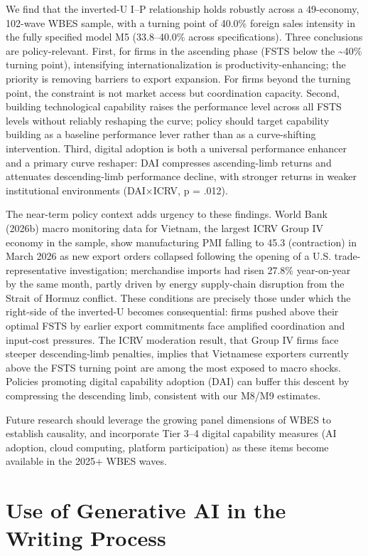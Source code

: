 \documentclass[
  12pt]{article}
\begin{document}
We find that the inverted-U I--P relationship holds robustly across a
49-economy, 102-wave WBES sample, with a turning point of 40.0\% foreign
sales intensity in the fully specified model M5 (33.8--40.0\% across
specifications). Three conclusions are policy-relevant. First, for firms
in the ascending phase (FSTS below the \textasciitilde40\% turning
point), intensifying internationalization is productivity-enhancing; the
priority is removing barriers to export expansion. For firms beyond the
turning point, the constraint is not market access but coordination
capacity. Second, building technological capability raises the
performance level across all FSTS levels without reliably reshaping the
curve; policy should target capability building as a baseline
performance lever rather than as a curve-shifting intervention. Third,
digital adoption is both a universal performance enhancer and a primary
curve reshaper: DAI compresses ascending-limb returns and attenuates
descending-limb performance decline, with stronger returns in weaker
institutional environments (DAI×ICRV, p = .012).

The near-term policy context adds urgency to these findings. World Bank
(2026b) macro monitoring data for Vietnam, the largest ICRV Group IV
economy in the sample, show manufacturing PMI falling to 45.3
(contraction) in March 2026 as new export orders collapsed following the
opening of a U.S. trade-representative investigation; merchandise
imports had risen 27.8\% year-on-year by the same month, partly driven
by energy supply-chain disruption from the Strait of Hormuz conflict.
These conditions are precisely those under which the right-side of the
inverted-U becomes consequential: firms pushed above their optimal FSTS
by earlier export commitments face amplified coordination and input-cost
pressures. The ICRV moderation result, that Group IV firms face steeper
descending-limb penalties, implies that Vietnamese exporters currently
above the FSTS turning point are among the most exposed to macro shocks.
Policies promoting digital capability adoption (DAI) can buffer this
descent by compressing the descending limb, consistent with our M8/M9
estimates.

Future research should leverage the growing panel dimensions of WBES to
establish causality, and incorporate Tier 3--4 digital capability
measures (AI adoption, cloud computing, platform participation) as these
items become available in the 2025+ WBES waves.

\hypertarget{use-of-generative-ai-in-the-writing-process}{%
\section{Use of Generative AI in the Writing
Process}\label{use-of-generative-ai-in-the-writing-process}}
\end{document}
